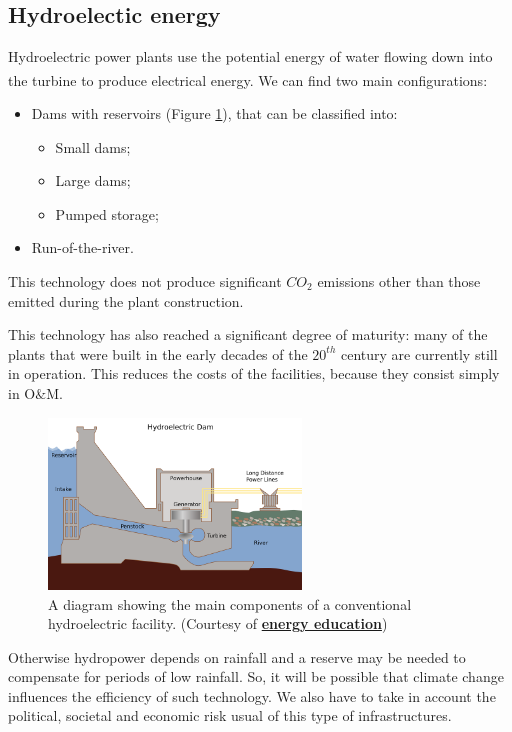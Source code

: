 \subsection{Hydroelectic energy}
Hydroelectric power plants use the potential energy of water flowing down into the turbine to produce electrical energy. We can find two main configurations\textsuperscript{\cite{lakohydro2010}}:
\begin{itemize}
    \item Dams with reservoirs (Figure \ref{fig:dam}), that can be classified into:
    \begin{itemize}
        \item Small dams;
        \item Large dams;
        \item Pumped storage;
    \end{itemize}
    \item Run-of-the-river.
\end{itemize}

This technology does not produce significant $CO_2$ emissions other than those emitted during the plant construction. 

This technology has also reached a significant degree of maturity: many of the plants that were built in the early decades of the $20^{th}$ century are currently still in operation. This reduces the costs of the facilities, because they consist simply in O$\&$M.

\begin{figure}[h]
    \centering
    \includegraphics[width=0.6\textwidth]{Chapters/Pictures/Damparts.png}
    \caption{\small{A diagram showing the main components of a conventional hydroelectric facility.
    (Courtesy of \textbf{\href{https://energyeducation.ca/wiki/images/8/8e/Damparts.png}{energy education}})}}
    \label{fig:dam}
\end{figure}

Otherwise hydropower depends on rainfall and a reserve may be needed to compensate for periods of low rainfall. So, it will be possible that climate change influences the efficiency of such technology. We also have to take in account the political, societal and economic risk usual of this type of infrastructures.

